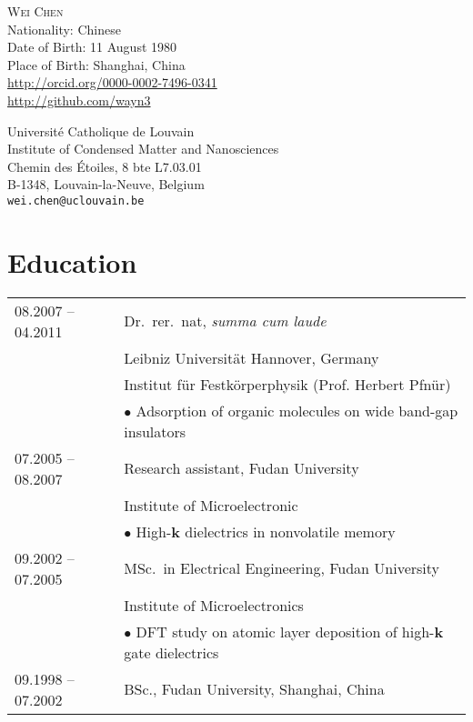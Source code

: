 \documentclass[a4paper, 11pt, DIV=15,headings=normal]{scrartcl}
\begin{document}
\begin{minipage}{0.50\linewidth}
{\Large \textsc{Wei Chen}}\\
Nationality: Chinese \\
Date of Birth: 11 August 1980 \\
Place of Birth: Shanghai, China \\
\small \url{http://orcid.org/0000-0002-7496-0341} \\
\small \url{http://github.com/wayn3}
\end{minipage}\hfill
\begin{minipage}{0.45\linewidth}
Universit\'{e} Catholique de Louvain\\
Institute of Condensed Matter and Nanosciences\\
Chemin des \'{E}toiles, 8 bte L7.03.01 \\
B-1348, Louvain-la-Neuve, Belgium \\
\texttt{wei.chen@uclouvain.be}
\end{minipage}
\vspace{6mm}

\section*{Education}
\begin{tabular}{ll}
08.2007 -- 04.2011 & Dr.\ rer.\ nat, \emph{summa cum laude}  \\
                   & Leibniz Universit\"{a}t Hannover, Germany\\
                   & Institut f\"{u}r Festk\"{o}rperphysik (Prof. Herbert Pfn\"{u}r) \\
                   & $\bullet$ Adsorption of organic molecules on wide band-gap insulators \\
07.2005 -- 08.2007 & Research assistant, Fudan University\\
                   & Institute of Microelectronic \\
                   & $\bullet$ High-$\mathbf{k}$ dielectrics in nonvolatile memory \\
09.2002 -- 07.2005 & MSc.\ in Electrical Engineering, Fudan University \\
                   & Institute of Microelectronics  \\
                   & $\bullet$ DFT study on atomic layer deposition of high-$\mathbf{k}$ gate dielectrics\\
09.1998 -- 07.2002 & BSc., Fudan University, Shanghai, China
\end{tabular}
\end{document}
